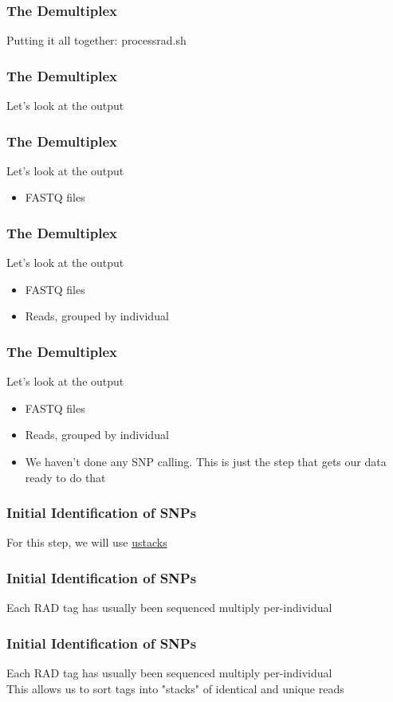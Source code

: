 \documentclass{beamer}
\begin{document}
\begin{frame}
\frametitle{The Demultiplex}
Putting it all together: processrad.sh
\end{frame}

\begin{frame}
\frametitle{The Demultiplex}
Let's look at the output
\end{frame}

\begin{frame}
\frametitle{The Demultiplex}
Let's look at the output
\begin{itemize}
\item FASTQ files
\end{itemize}
\end{frame}

\begin{frame}
\frametitle{The Demultiplex}
Let's look at the output
\begin{itemize}
\item FASTQ files
\item Reads, grouped by individual
\end{itemize}
\end{frame}

\begin{frame}
\frametitle{The Demultiplex}
Let's look at the output
\begin{itemize}
\item FASTQ files
\item Reads, grouped by individual
\item We haven't done any SNP calling. This is just the step that gets our data ready to do that
\end{itemize}
\end{frame}

\begin{frame}
\frametitle{Initial Identification of SNPs}
For this step, we will use \href{http://catchenlab.life.illinois.edu/stacks/comp/ustacks.php}{ustacks}
\end{frame}

\begin{frame}
\frametitle{Initial Identification of SNPs}
Each RAD tag has usually been sequenced multiply per-individual
\end{frame}

\begin{frame}
\frametitle{Initial Identification of SNPs}
Each RAD tag has usually been sequenced multiply per-individual \\
This allows us to sort tags into "stacks" of identical and unique reads
\end{frame}
\end{document}

